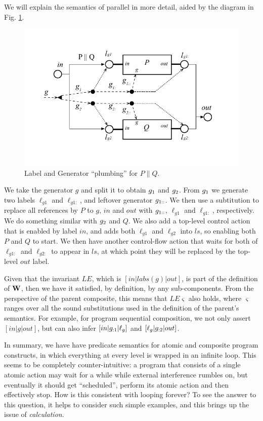 We will explain the semantics of parallel in more detail,
aided by the diagram in Fig. \ref{fig:PAR-plumbing}.
\begin{figure}
  \includegraphics[scale=1.0]{images/PAR}
  \caption{Label and Generator ``plumbing'' for $P \parallel Q$.}
  \label{fig:PAR-plumbing}
\end{figure}
We take the generator $g$ and split it to obtain $g_{1}$ and $g_{2}$.
From $g_{1}$ we generate two labels $\ell_{g1}$ and $\ell_{g1:}$,
and leftover generator $g_{1::}$.
We then use a subtitution to replace all references
by $P$ to $g$, $in$ and $out$ with $g_{1::}$, $\ell_{g1}$ and $\ell_{g1:}$,
respectively. We do something similar with $g_{2}$ and $Q$.
We also add a top-level control action that is enabled by label $in$,
and adds both $\ell_{g1}$ and $\ell_{g2}$ into $ls$,
so enabling both $P$ and $Q$ to start.
We then have another control-flow action that waits for both of $\ell_{g1:}$
and $\ell_{g2:}$  to appear in $ls$,
at which point they will be replaced by the top-level $out$ label.

Given that the invariant $LE$, which is $[in|labs(g)|out]$,
is part of the definition of $\mathbf{W}$,
then we have it satisfied, by definition, by any sub-components.
From the perspective of the parent composite, this means that $LE\varsigma$
also holds, where $\varsigma$ ranges over all the sound substitutions
used in the definition of the parent's semantics.
For example, for program sequential composition,
we not only assert $[in|g|out]$,
but can also infer $[in|g_{:1}|\ell_g]$
and $[\ell_g|g_{:2}|out]$.


In summary,
we have have predicate semantics for atomic and composite program
constructs,
in which everything at every level is wrapped in an infinite loop.
This seems to be completely counter-intuitive:
a program that consists of a single atomic action may wait
for a while while external interference rumbles on,
but eventually it should get ``scheduled'', perform its atomic action
and then effectively stop.
How is this consistent with looping forever?
To see the answer to this question,
it helps to consider such simple examples,
and this brings up the issue of \emph{calculation}.
